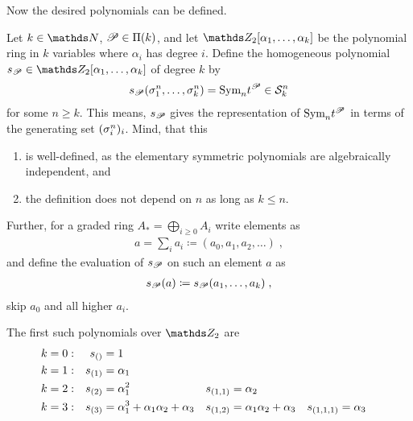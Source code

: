 Now the desired polynomials can be defined.
\begin{Def}
  Let $k\in\Nat$, $\mathscr{P}\in\Pi({k})$, and let
  $\Zmod2[\alpha_1,\dotsc,\alpha_k]$ be the polynomial ring in $k$
  variables where $\alpha_i$ has degree $i$.
  Define the homogeneous polynomial
  $\s{\Part}\in\Zmod2[\alpha_1,\dotsc,\alpha_k]$ of degree $k$ by
  \begin{gather*}
    s_{\mathscr{P}}(\sigma_{1}^{n},\dotsc, \sigma_{k}^{n}) = \text{\normalfont Sym}_{n} t^{\mathscr{P}} \in \mathcal{S}^{n}_k
  \end{gather*}
  for some $n\geq k$. This means, $s_{\mathscr{P}}$ gives the representation
  of $\text{\normalfont Sym}_{n}t^{\mathscr{P}}$ in terms of the generating set $(\sigma_{i}^{n})_i$.
  Mind, that this
  \begin{enumerate}
  \item is well-defined, as the elementary symmetric
    polynomials are algebraically independent, and
  \item the definition does not depend on $n$ as long as $k\leq n$.
  \end{enumerate}
  Further, for a graded ring $A_*=\bigoplus_{i\geq 0} A_i$ write
  elements as
  \begin{gather*}
    a=\sum_i a_i \coloneqq (a_0,a_1,a_2,\dotsc)
    \;,
  \end{gather*}
  and define the evaluation of $s_{\mathscr{P}}$ on such an element $a$ as
  \begin{gather*}
    s_{\mathscr{P}}(a) \coloneqq s_{\mathscr{P}}(a_1,\dotsc,a_k)
    \;,
  \end{gather*}
  \idest skip $a_0$ and all higher $a_i$.
\end{Def}

\begin{Ex}
  The first such polynomials over $\Zmod2$ are
  \begin{align*}
    k&=0:
    &s_{()} &= 1
    \\ k&=1:
    &s_{(1)} &= \alpha_1
    \\ k&=2:
    &s_{(2)} &= \alpha_1^2
        &s_{(1,1)} &= \alpha_2
    \\ k&=3:
    &s_{(3)} &= \alpha_1^3 + \alpha_1\alpha_2 + \alpha_3
        &s_{(1,2)} &= \alpha_1\alpha_2 + \alpha_3
             &s_{(1,1,1)} &= \alpha_3
  \end{align*}
  \cite[p.~90]{milnorlectures}
\end{Ex}

